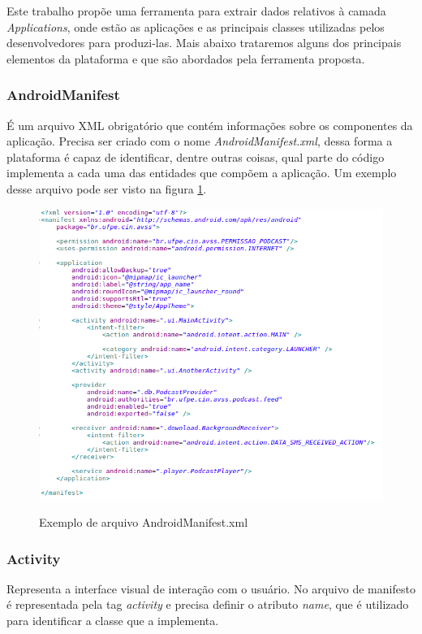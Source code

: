 \documentclass[a4paper,12pt]{article}
\numberwithin{figure}{section}
\begin{document}
Este trabalho propõe uma ferramenta para extrair dados relativos à camada \textit{Applications}, onde estão as aplicações e as principais classes utilizadas pelos desenvolvedores para produzi-las. Mais abaixo trataremos alguns dos principais elementos da plataforma e que são abordados pela ferramenta proposta.

\subsubsection{AndroidManifest}
É um arquivo XML obrigatório que contém informações sobre os componentes da aplicação. Precisa ser criado com o nome \textit{AndroidManifest.xml}, dessa forma a plataforma é capaz de identificar, dentre outras coisas, qual parte do código implementa a cada uma das entidades que compõem a aplicação. Um exemplo desse arquivo pode ser visto na figura \ref{fig:manifest}.

 \begin{figure}[h]
 \centering
 \includegraphics[width=\linewidth]{imgs/manifest.png}
 \label{fig:manifest}
 \caption{Exemplo de arquivo AndroidManifest.xml}
 \end{figure}



\subsubsection{Activity}
Representa a interface visual de interação com o usuário. No arquivo de manifesto é representada pela tag \textit{activity} e precisa definir o atributo \textit{name}, que é utilizado para identificar a classe que a implementa.\\
\end{document}
